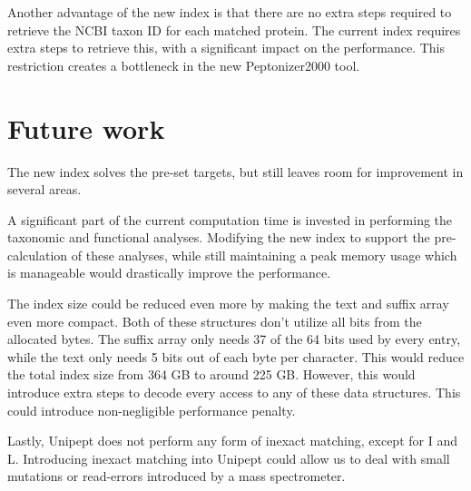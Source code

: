 \documentclass[11pt]{article}
\begin{document}
\begin{multicols}{2}
        Another advantage of the new index is that there are no extra steps required to retrieve the NCBI taxon ID for each matched protein.
        The current index requires extra steps to retrieve this, with a significant impact on the performance.
        This restriction creates a bottleneck in the new Peptonizer2000 tool.

        \section{Future work}
        The new index solves the pre-set targets, but still leaves room for improvement in several areas.

        A significant part of the current computation time is invested in performing the taxonomic and functional analyses.
        Modifying the new index to support the pre-calculation of these analyses, while still maintaining a peak memory usage which is manageable would drastically improve the performance.

        The index size could be reduced even more by making the text and suffix array even more compact.
        Both of these structures don't utilize all bits from the allocated bytes.
        The suffix array only needs 37 of the 64 bits used by every entry, while the text only needs 5 bits out of each byte per character.
        This would reduce the total index size from 364 GB to around 225 GB\@.
        However, this would introduce extra steps to decode every access to any of these data structures.
        This could introduce non-negligible performance penalty.

        Lastly, Unipept does not perform any form of inexact matching, except for I and L\@.
        Introducing inexact matching into Unipept could allow us to deal with small mutations or read-errors introduced by a mass spectrometer.
        \printbibliography
    \end{multicols}
\end{document}
